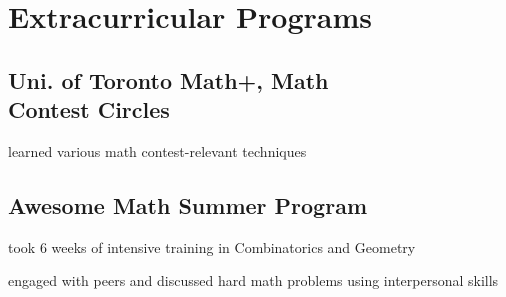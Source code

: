 \section{Extracurricular Programs} 

\subsection{Uni. of Toronto Math+, Math \\ Contest Circles}
\sectionsep
\begin{tightemize}
\item learned various math contest-relevant techniques
\end{tightemize}
\sectionsep

\subsection{Awesome Math Summer Program}
\begin{tightemize}
\item took 6 weeks of intensive training in Combinatorics and Geometry
\item engaged with peers and discussed hard math problems using interpersonal skills
\end{tightemize}
\sectionsep